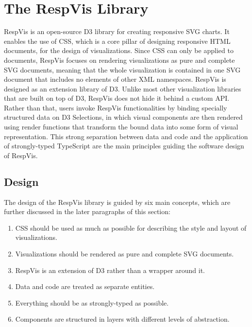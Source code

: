 \chapter{The RespVis Library}
\label{chap:RespVis}

RespVis is an open-source D3 library for creating responsive SVG charts.
It enables the use of CSS, which is a core pillar of designing responsive HTML documents, for the design of visualizations.
Since CSS can only be applied to documents, RespVis focuses on rendering visualizations as pure and complete SVG documents, meaning that the whole visualization is contained in one SVG document that includes no elements of other XML namespaces.
RespVis is designed as an extension library of D3. 
Unlike most other visualization libraries that are built on top of D3, RespVis does not hide it behind a custom API.
Rather than that, users invoke RespVis functionalities by binding specially structured data on D3 Selections, in which visual components are then rendered using render functions that transform the bound data into some form of visual representation.
This strong separation between data and code and the application of strongly-typed TypeScript are the main principles guiding the software design of RespVis.

\section{Design}
\label{sec:Design}

The design of the RespVis library is guided by six main concepts, which are further discussed in the later paragraphs of this section:

\begin{enumerate}
\item CSS should be used as much as possible for describing the style and layout of visualizations.
\item Visualizations should be rendered as pure and complete SVG documents.
\item RespVis is an extension of D3 rather than a wrapper around it.
\item Data and code are treated as separate entities.
\item Everything should be as strongly-typed as possible.
\item Components are structured in layers with different levels of abstraction.
\end{enumerate}

